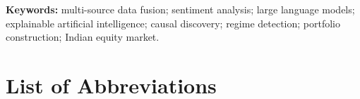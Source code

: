 \vspace{0.6em}
\noindent\textbf{Keywords:} multi-source data fusion; sentiment analysis; large language
models; explainable artificial intelligence; causal discovery; regime detection; portfolio
construction; Indian equity market.

\clearpage
\renewcommand{\contentsname}{Table of Contents}
{\tableofcontents}

\clearpage
\renewcommand{\listfigurename}{List of Figures}
{\listoffigures}

\clearpage
\renewcommand{\listtablename}{List of Tables}
{\listoftables}

\clearpage
\chapter*{List of Abbreviations}
\thispagestyle{plain}

